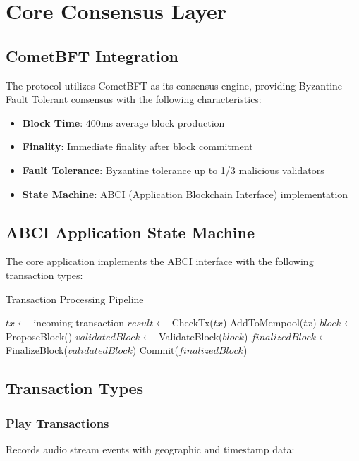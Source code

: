 \documentclass[11pt,a4paper]{article}
\begin{document}
\section{Core Consensus Layer}

\subsection{CometBFT Integration}

The protocol utilizes CometBFT as its consensus engine, providing Byzantine Fault Tolerant consensus with the following characteristics:

\begin{itemize}
  \item \textbf{Block Time}: 400ms average block production
  \item \textbf{Finality}: Immediate finality after block commitment
  \item \textbf{Fault Tolerance}: Byzantine tolerance up to 1/3 malicious validators
  \item \textbf{State Machine}: ABCI (Application Blockchain Interface) implementation
\end{itemize}

\subsection{ABCI Application State Machine}

The core application implements the ABCI interface with the following transaction types:

\begin{algorithm}
  \caption{Transaction Processing Pipeline}
  \begin{algorithmic}[1]
    \STATE $tx \leftarrow$ incoming transaction
    \STATE $result \leftarrow$ CheckTx($tx$)
    \STATE AddToMempool($tx$)
    \ENDIF
    \STATE $block \leftarrow$ ProposeBlock()
    \STATE $validatedBlock \leftarrow$ ValidateBlock($block$)
    \STATE $finalizedBlock \leftarrow$ FinalizeBlock($validatedBlock$)
    \STATE Commit($finalizedBlock$)
  \end{algorithmic}
\end{algorithm}

\subsection{Transaction Types}

\subsubsection{Play Transactions}
Records audio stream events with geographic and timestamp data:
\end{document}
